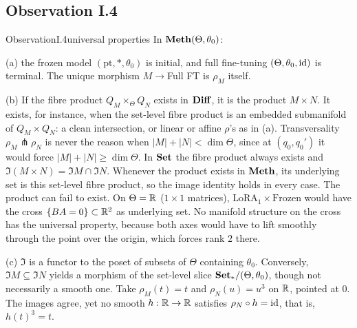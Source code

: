 \subsection{Observation I.4}\label{proof:I.4}

\begin{restate}{Observation}{I.4}{universal properties}
In $\mathbf{Meth}(\Theta,\theta_0)$:

(a) the frozen model $(\mathrm{pt},*,\theta_0)$ is initial, and full fine-tuning $(\Theta,\theta_0,\mathrm{id})$ is terminal. The
unique morphism $M\to{}$Full FT is $\rho_M$ itself.

(b) If the fibre product $Q_M\times_\Theta Q_N$ exists in $\mathbf{Diff}$, it is the product $M\times N$. It exists, for instance,
when the set-level fibre product is an embedded submanifold of $Q_M\times Q_N$: a clean intersection, or linear or affine
$\rho$'s as in (a). Transversality $\rho_M\pitchfork\rho_N$ is never the reason when
$\lvert M\rvert+\lvert N\rvert<\dim\Theta$, since at $(q_0,q_0')$ it would force $\lvert M\rvert+\lvert
N\rvert\ge\dim\Theta$. In $\mathbf{Set}$ the fibre product always exists and $\Im(M\times N)=\Im M\cap\Im N$. Whenever the product
exists in $\mathbf{Meth}$, its underlying set is this set-level fibre product, so the image identity holds in every case. The
product can fail to exist. On $\Theta=\mathbb{R}$ ($1\times1$ matrices), $\mathrm{LoRA}_1\times\text{Frozen}$ would have the cross
$\{BA=0\}\subset\mathbb{R}^2$ as underlying set. No manifold structure on the cross has the universal property, because both axes
would have to lift smoothly through the point over the origin, which forces rank $2$ there.

(c) $\Im$ is a functor to the poset of subsets of $\Theta$ containing $\theta_0$. Conversely, $\Im M\subseteq\Im N$ yields
a morphism of the set-level slice $\mathbf{Set}_*/(\Theta,\theta_0)$, though not necessarily a smooth one. Take $\rho_M(t)=t$ and
$\rho_N(u)=u^3$ on $\mathbb{R}$, pointed at $0$. The images agree, yet no smooth $h:\mathbb{R}\to\mathbb{R}$ satisfies $\rho_N\circ h=\mathrm{id}$, that
is, $h(t)^3=t$.
\end{restate}


